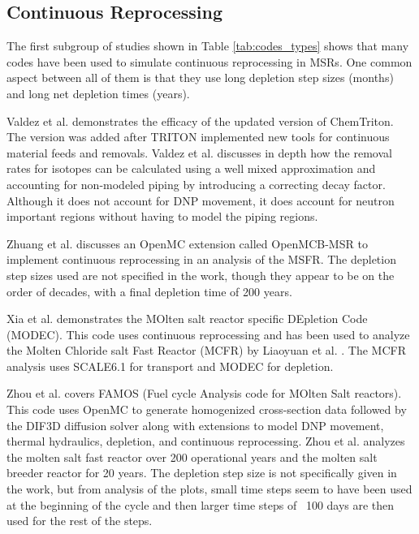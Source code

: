 \subsection{Continuous Reprocessing}
\label{litrev-msr-continuous}

The first subgroup of studies shown in Table \ref{tab:codes_types} shows that many codes have been used to simulate continuous reprocessing in MSRs. One common aspect between all of them is that they use long depletion step sizes (months) and long net depletion times (years).

Valdez et al. \cite{jr_vicente_valdez_modeling_2020} demonstrates the efficacy of the updated version of ChemTriton. The version was added after TRITON implemented new tools for continuous material feeds and removals. Valdez et al. discusses in depth how the removal rates for isotopes can be calculated using a well mixed approximation and accounting for non-modeled piping by introducing a correcting decay factor. Although it does not account for DNP movement, it does account for neutron important regions without having to model the piping regions.

Zhuang et al. \cite{zhuang_extended_2020} discusses an OpenMC extension called OpenMCB-MSR to implement continuous reprocessing in an analysis of the MSFR. The depletion step sizes used are not specified in the work, though they appear to be on the order of decades, with a final depletion time of 200 years.

Xia et al. \cite{xia_development_2019} demonstrates the MOlten salt reactor specific DEpletion Code (MODEC). This code uses continuous reprocessing and has been used to analyze the Molten Chloride salt Fast Reactor (MCFR) by Liaoyuan et al. \cite{liaoyuan_th-u_2021}. The MCFR analysis uses SCALE6.1 for transport and MODEC for depletion.

Zhou et al. \cite{zhou_fuel_2018} covers FAMOS (Fuel cycle Analysis code for MOlten Salt reactors). This code uses OpenMC to generate homogenized cross-section data followed by the DIF3D diffusion solver along with extensions to model DNP movement, thermal hydraulics, depletion, and continuous reprocessing. Zhou et al. analyzes the molten salt fast reactor over 200 operational years and the molten salt breeder reactor for 20 years. The depletion step size is not specifically given in the work, but from analysis of the plots, small time steps seem to have been used at the beginning of the cycle and then larger time steps of ~100 days are then used for the rest of the steps.

